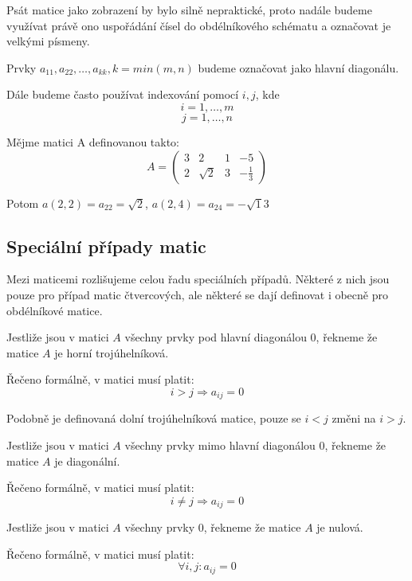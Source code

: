 Psát matice jako zobrazení by bylo silně nepraktické, proto nadále budeme využívat
právě ono uspořádání čísel do obdélníkového schématu a označovat je velkými písmeny.

Prvky $a_{11}, a_{22}, \ldots, a_{kk}, k = min(m, n)$ budeme označovat jako hlavní
diagonálu.

Dále budeme často používat indexování pomocí $i, j$, kde
$$i = 1, \ldots, m$$
$$j = 1, \ldots, n$$

\begin{example}[Matice]

    Mějme matici A definovanou takto:
    $$ A = \begin{pmatrix}
        3 & 2 & 1 & -5 \\
        2 & \sqrt{2} & 3 & -\frac{1}{3}
        \end{pmatrix}  $$

    Potom $a(2, 2) = a_{22} = \sqrt{2}$, $a(2, 4) = a_{24} = -\sqrt{1}{3}$
\end{example}

\subsection{Speciální případy matic}
Mezi maticemi rozlišujeme celou řadu speciálních případů. Některé z nich jsou pouze
pro případ matic čtvercových, ale některé se dají definovat i obecně pro obdélníkové matice.

\begin{definition}
    Jestliže jsou v matici $A$ všechny prvky pod hlavní diagonálou 0,
    řekneme že matice $A$ je horní trojúhelníková.

    Řečeno formálně, v matici musí platit:
    $$i > j \Rightarrow a_{ij} = 0$$

    Podobně je definovaná dolní trojúhelníková matice, pouze se $i < j$ změni na $i > j$.
\end{definition}

\begin{definition}
    Jestliže jsou v matici $A$ všechny prvky mimo hlavní diagonálou 0,
    řekneme že matice $A$ je diagonální.

    Řečeno formálně, v matici musí platit:
    $$i \neq j \Rightarrow a_{ij} = 0$$
\end{definition}

\begin{definition}
    Jestliže jsou v matici $A$ všechny prvky 0,
    řekneme že matice $A$ je nulová.

    Řečeno formálně, v matici musí platit:
    $$\forall i,j: a_{ij} = 0$$
\end{definition}

